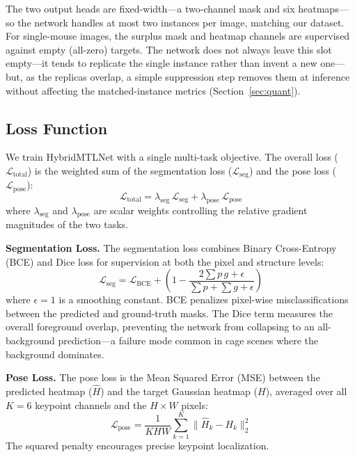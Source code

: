 \documentclass[runningheads]{llncs}
\begin{document}
\noindent The two output heads are fixed-width---a two-channel
mask and six heatmaps---so the network handles at most two
instances per image, matching our dataset. For single-mouse images,
the surplus mask and heatmap channels are supervised against empty
(all-zero) targets. The network does not always leave this slot
empty---it tends to replicate the single instance rather than invent a
new one---but, as the replicas overlap, a simple suppression step
removes them at inference without affecting the matched-instance
metrics (Section~\ref{sec:quant}).

\subsection{Loss Function}
We train HybridMTLNet with a single multi-task objective. The overall
loss ($\mathcal{L}_{\text{total}}$) is the weighted sum of the
segmentation loss ($\mathcal{L}_{\text{seg}}$) and the pose loss
($\mathcal{L}_{\text{pose}}$):
\begin{equation}
  \mathcal{L}_{\text{total}} = \lambda_{\text{seg}}\,\mathcal{L}_{\text{seg}}
              + \lambda_{\text{pose}}\,\mathcal{L}_{\text{pose}}
  \label{eq:loss}
\end{equation}
where $\lambda_{\text{seg}}$ and $\lambda_{\text{pose}}$ are scalar
weights controlling the relative gradient magnitudes of the two tasks.

\noindent\textbf{Segmentation Loss.}
The segmentation loss combines Binary Cross-Entropy (BCE) and Dice
loss \cite{milletari2016vnet} for supervision at both the pixel and
structure levels:
\begin{equation}
  \mathcal{L}_{\text{seg}} = \mathcal{L}_{\text{BCE}} +
  \left(1 - \frac{2\sum p\,g + \epsilon}{\sum p + \sum g + \epsilon}\right)
\end{equation}
where $\epsilon = 1$ is a smoothing constant. BCE penalizes
pixel-wise misclassifications between the predicted and ground-truth
masks. The Dice term measures the overall foreground overlap,
preventing the network from collapsing to an all-background
prediction---a failure mode common in cage scenes where the
background dominates.

\noindent\textbf{Pose Loss.}
The pose loss is the Mean Squared Error (MSE) between the predicted
heatmap ($\hat{H}$) and the target Gaussian heatmap ($H$), averaged
over all $K = 6$ keypoint channels and the $H \times W$ pixels:
\begin{equation}
  \mathcal{L}_{\text{pose}} = \frac{1}{K H W}
  \sum_{k=1}^{K} \|\hat{H}_k - H_k\|_2^2
\end{equation}
The squared penalty encourages precise keypoint localization.
\end{document}
